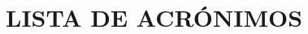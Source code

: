 \section{LISTA DE ACRÓNIMOS} %
\printnoidxglossary[type=\acronymtype,title=] %
\printnoidxglossary[title=] %